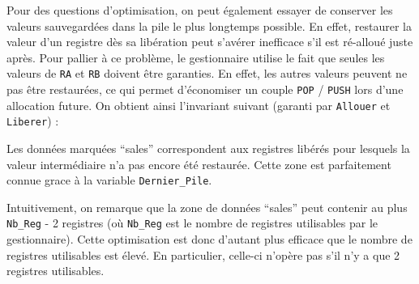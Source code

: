Pour des questions d'optimisation, on peut également essayer de conserver les valeurs sauvegardées dans la pile le plus longtemps possible. En effet, restaurer la valeur d'un registre dès sa libération peut s'avérer inefficace s'il est ré-alloué juste après. Pour pallier à ce problème, le gestionnaire utilise le fait que seules les valeurs de \verb!RA! et \verb!RB! doivent être garanties. En effet, les autres valeurs peuvent ne pas être restaurées, ce qui permet d'économiser un couple \verb!POP! / \verb!PUSH! lors d'une allocation future. On obtient ainsi l'invariant suivant (garanti par \verb!Allouer! et \verb!Liberer!) :

\begin{center}
\end{center}

Les données marquées ``sales'' correspondent aux registres libérés pour lesquels la valeur intermédiaire n'a pas encore été restaurée. Cette zone est parfaitement connue grace à la variable \verb!Dernier_Pile!.

Intuitivement, on remarque que la zone de données ``sales'' peut contenir au plus \verb!Nb_Reg! - 2 registres (où \verb!Nb_Reg! est le nombre de registres utilisables par le gestionnaire). Cette optimisation est donc d'autant plus efficace que le nombre de registres utilisables est élevé. En particulier, celle-ci n'opère pas s'il n'y a que 2 registres utilisables.

